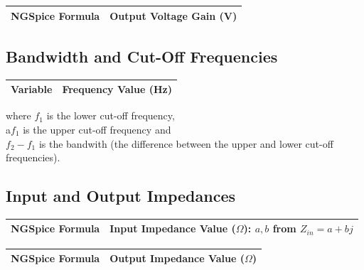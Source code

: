 \begin{table}[H] \centering
  \begin{tabular}{|l|r|}
    \hline    
    {\bf NGSpice Formula} & {\bf Output Voltage Gain (V)} \\ \hline
    
  \end{tabular}
 \label{tab:outvoltagegain}
\end{table}

\subsection{Bandwidth and Cut-Off Frequencies}

\begin{table}[H] \centering
  \begin{tabular}{|l|r|}
    \hline    
    {\bf Variable} & {\bf Frequency Value (Hz)} \\ \hline
    
  \end{tabular}
 \label{tab:cutofffreq}
\end{table}

where $f_1$ is the lower cut-off frequency,\\
a$f_1$ is the upper cut-off frequency and\\
$f_2-f_1$ is the bandwith (the difference between the upper and lower cut-off frequencies).

\subsection{Input and Output Impedances}

\begin{table}[H] \centering
  \begin{tabular}{|l|r|}
    \hline    
    {\bf NGSpice Formula} & {\bf Input Impedance Value ($\Omega$): $a,b$ from $Z_{in}=a+bj$}\\ \hline
    
  \end{tabular}
 \label{tab:inputimp}
\end{table}

\begin{table}[H] \centering
  \begin{tabular}{|l|r|}
    \hline    
    {\bf NGSpice Formula} & {\bf Output Impedance Value ($\Omega$)}\\ \hline
    
  \end{tabular}
 \label{tab:inputimp}
\end{table}
